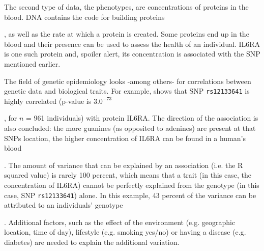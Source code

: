 The second type of data, the phenotypes, 
are concentrations of proteins in the blood. 
DNA contains the code for building proteins

, as well as the rate
at which a protein is created. Some proteins end up in the blood and
their presence can be used to assess the health of an individual.
IL6RA is one such protein and, spoiler alert, its concentration
is associated with the SNP mentioned earlier.

The field of genetic epidemiology looks -among others- for
correlations between genetic data and biological traits.
For example, \cite{ahsan2017relative} shows that
SNP \verb|rs12133641| is highly correlated (p-value is $3.0^{-73}$

,
for $n$ = 961 individuals) with protein IL6RA.
The direction of the association is also concluded:
the more guanines (as opposited to adenines) are present at that SNPs location,
the higher concentration of IL6RA can be found in a human's blood

. The amount of variance that can be explained by an association (i.e.
the R squared value) is rarely 100 percent, which means that a trait (in
this case, the concentration of IL6RA) cannot be perfectly explained
from the genotype (in this case, SNP \verb|rs12133641|) alone. 
In this example, 43 percent of the variance 
can be attributed to an individuals' genotype

. Additional factors, 
such as the effect
of the environment (e.g. geographic location, time of day), 
lifestyle (e.g. smoking yes/no) or having a disease (e.g. diabetes) 
are needed to explain the additional variation.

